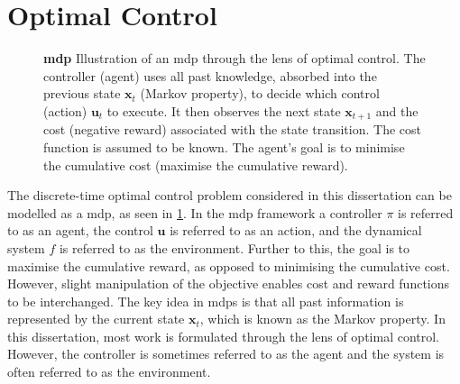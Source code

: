 \documentclass{mimosis-class/mimosis}
\numberwithin{equation}{chapter}
\newcommand{\state}{\ensuremath{\mathbf{x}}}
\newcommand{\control}{\ensuremath{\mathbf{u}}}
\begin{document}
\section{Optimal Control \label{sec-optimal-control}}
\label{sec:orgdb74308}
\begin{figure}[!t]
\centering
{}
\caption[\acrfull{mdp}]{\textbf{\acrfull{mdp}} Illustration of an \acrshort{mdp} through the lens of optimal control. The controller (agent) uses all past knowledge, absorbed into the previous state $\state_t$ (Markov property), to decide which control (action) $\control_t$ to execute. It then observes the next state $\state_{t+1}$ and the cost (negative reward) associated with the state transition. The cost function is assumed to be known. The agent's goal is to minimise the cumulative cost (maximise the cumulative reward).}
\label{fig-mdp}
\end{figure}
The discrete-time optimal control problem considered in this dissertation can be modelled as a
\acrfull{mdp}, as seen in \cref{fig-mdp}.
In the \acrshort{mdp} framework a controller \(\pi\) is referred to as an agent, the control \(\control\)
is referred to as an action, and the dynamical system \(f\) is referred to as the environment.
Further to this, the goal is to maximise the cumulative reward, as opposed to minimising the cumulative cost.
However, slight manipulation of the objective enables cost and reward functions to be interchanged.
The key idea in \acrshort{mdp}s is that all past information is represented by the current state \(\state_t\),
which is known as the Markov property.
In this dissertation, most work is formulated through the lens of optimal control.
However, the controller is sometimes referred to as the agent and the system is often referred to
as the environment.
\end{document}
